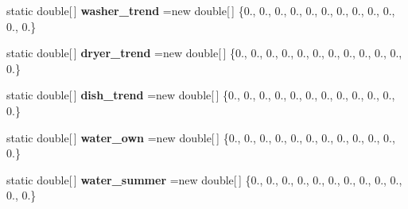 \begin{DoxyCompactItemize}
\item 
\hypertarget{classuk_1_1ac_1_1dmu_1_1iesd_1_1cascade_1_1util_1_1profilegenerators_1_1_m_s_const_arrays_a90dca7cdd8be57588bd17f119099be0e}{static double\mbox{[}$\,$\mbox{]} {\bfseries washer\-\_\-trend} =new double\mbox{[}$\,$\mbox{]} \{0., 0., 0., 0., 0., 0., 0., 0., 0., 0., 0., 0.\}}\label{classuk_1_1ac_1_1dmu_1_1iesd_1_1cascade_1_1util_1_1profilegenerators_1_1_m_s_const_arrays_a90dca7cdd8be57588bd17f119099be0e}

\item 
\hypertarget{classuk_1_1ac_1_1dmu_1_1iesd_1_1cascade_1_1util_1_1profilegenerators_1_1_m_s_const_arrays_a9d7939c7b8bae6bf8bd9fe3da8182e42}{static double\mbox{[}$\,$\mbox{]} {\bfseries dryer\-\_\-trend} =new double\mbox{[}$\,$\mbox{]} \{0., 0., 0., 0., 0., 0., 0., 0., 0., 0., 0., 0.\}}\label{classuk_1_1ac_1_1dmu_1_1iesd_1_1cascade_1_1util_1_1profilegenerators_1_1_m_s_const_arrays_a9d7939c7b8bae6bf8bd9fe3da8182e42}

\item 
\hypertarget{classuk_1_1ac_1_1dmu_1_1iesd_1_1cascade_1_1util_1_1profilegenerators_1_1_m_s_const_arrays_aaac4fcead36158d896237614ee8ab49a}{static double\mbox{[}$\,$\mbox{]} {\bfseries dish\-\_\-trend} =new double\mbox{[}$\,$\mbox{]} \{0., 0., 0., 0., 0., 0., 0., 0., 0., 0., 0., 0.\}}\label{classuk_1_1ac_1_1dmu_1_1iesd_1_1cascade_1_1util_1_1profilegenerators_1_1_m_s_const_arrays_aaac4fcead36158d896237614ee8ab49a}

\item 
\hypertarget{classuk_1_1ac_1_1dmu_1_1iesd_1_1cascade_1_1util_1_1profilegenerators_1_1_m_s_const_arrays_a2ac954d6fa87f7fceb95ba47cd1fb594}{static double\mbox{[}$\,$\mbox{]} {\bfseries water\-\_\-own} =new double\mbox{[}$\,$\mbox{]} \{0., 0., 0., 0., 0., 0., 0., 0., 0., 0., 0., 0.\}}\label{classuk_1_1ac_1_1dmu_1_1iesd_1_1cascade_1_1util_1_1profilegenerators_1_1_m_s_const_arrays_a2ac954d6fa87f7fceb95ba47cd1fb594}

\item 
\hypertarget{classuk_1_1ac_1_1dmu_1_1iesd_1_1cascade_1_1util_1_1profilegenerators_1_1_m_s_const_arrays_a9430c91d62ba8b97d34bc5ad12943160}{static double\mbox{[}$\,$\mbox{]} {\bfseries water\-\_\-summer} =new double\mbox{[}$\,$\mbox{]} \{0., 0., 0., 0., 0., 0., 0., 0., 0., 0., 0., 0.\}}\label{classuk_1_1ac_1_1dmu_1_1iesd_1_1cascade_1_1util_1_1profilegenerators_1_1_m_s_const_arrays_a9430c91d62ba8b97d34bc5ad12943160}


\end{DoxyCompactItemize}
